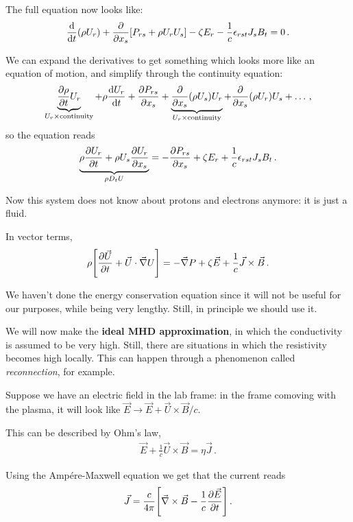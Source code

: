 \documentclass[main.tex]{subfiles}
\begin{document}
The full equation now looks like: 
%
\begin{align}
\dv{t}(\rho U_r) + \pdv{}{x_s} \qty[P_{rs} + \rho U_r U_s]
- \zeta E_r 
- \frac{1}{c} \epsilon_{rst} J_s B_t = 0
\,.
\end{align}

We can expand the derivatives to get something which looks more like an equation of motion, and simplify through the continuity equation:  
%
\begin{align}
\underbrace{\pdv{\rho }{t} U_r}_{U_r \times \text{continuity}} + \rho \dv{U_r}{t} + \pdv{P_{rs}}{x_s}
+ \underbrace{\pdv{}{x_s} \qty(\rho U_s) U_r}_{U_r \times \text{continuity}} 
+ \pdv{}{x_s} \qty(\rho U_r) U_s + \dots
\,,
\end{align}
%
so the equation reads 
%
\begin{align}
\underbrace{\rho \pdv{U_r}{t} + \rho U_s \pdv{U_r}{x_s} }_{\rho D_t U}
= - \pdv{P_{rs}}{x_s} + \zeta E_r
+ \frac{1}{c} \epsilon_{rst} J_s B_t
\,.
\end{align}

Now this system does not know about protons and electrons anymore: it is just a fluid. 

In vector terms, 
%
\begin{align}
\rho \qty[ \pdv{\vec{U}}{t} + \vec{U} \cdot \vec{\nabla} U]
= - \vec{\nabla} P + \zeta \vec{E} + \frac{1}{c} \vec{J} \times \vec{B}
\,.
\end{align}

We haven't done the energy conservation equation since it will not be useful for our purposes, while being very lengthy. 
Still, in principle we should use it. 

We will now make the \textbf{ideal MHD approximation}, in which the conductivity is assumed to be very high. 
Still, there are situations in which the resistivity becomes high locally. 
This can happen through a phenomenon called \emph{reconnection}, for example. 

Suppose we have an electric field in the lab frame: in the frame comoving with the plasma, it will look like \(\vec{E} \to \vec{E} + \vec{U} \times \vec{B} / c\). 

This can be described by Ohm's law, 
%
\begin{align}
\vec{E} + \frac{1}{c} \vec{U} \times \vec{B} = \eta \vec{J}
\,.
\end{align}

Using the Ampére-Maxwell equation we get that the current reads 
%
\begin{align}
\vec{J} = \frac{c}{4 \pi } \qty[\vec{\nabla} \times \vec{B} - \frac{1}{c} \pdv{\vec{E}}{t}]
\,.
\end{align}
\end{document}
